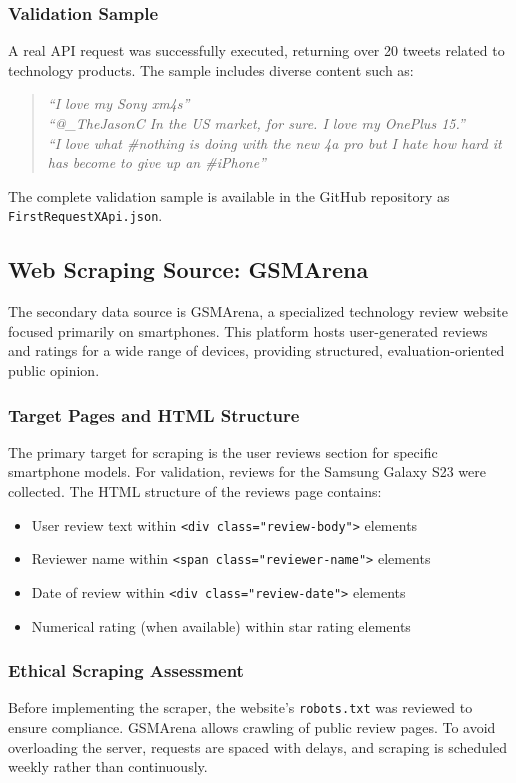 \documentclass[12pt]{article}
\begin{document}
\subsubsection{Validation Sample}
A real API request was successfully executed, returning over 20 tweets related to technology products. The sample includes diverse content such as:

\begin{quote}
\textit{“I love my Sony xm4s”} \\
\textit{“@\_TheJasonC In the US market, for sure. I love my OnePlus 15.”} \\
\textit{“I love what \#nothing is doing with the new 4a pro but I hate how hard it has become to give up an \#iPhone”}
\end{quote}

The complete validation sample is available in the GitHub repository as \texttt{FirstRequestXApi.json}.

\subsection{Web Scraping Source: GSMArena}

The secondary data source is GSMArena, a specialized technology review website focused primarily on smartphones. This platform hosts user-generated reviews and ratings for a wide range of devices, providing structured, evaluation-oriented public opinion.

\subsubsection{Target Pages and HTML Structure}
The primary target for scraping is the user reviews section for specific smartphone models. For validation, reviews for the Samsung Galaxy S23 were collected. The HTML structure of the reviews page contains:
\begin{itemize}
    \item User review text within \texttt{<div class="review-body">} elements
    \item Reviewer name within \texttt{<span class="reviewer-name">} elements
    \item Date of review within \texttt{<div class="review-date">} elements
    \item Numerical rating (when available) within star rating elements
\end{itemize}

\subsubsection{Ethical Scraping Assessment}
Before implementing the scraper, the website's \texttt{robots.txt} was reviewed to ensure compliance. GSMArena allows crawling of public review pages. To avoid overloading the server, requests are spaced with delays, and scraping is scheduled weekly rather than continuously.
\end{document}
